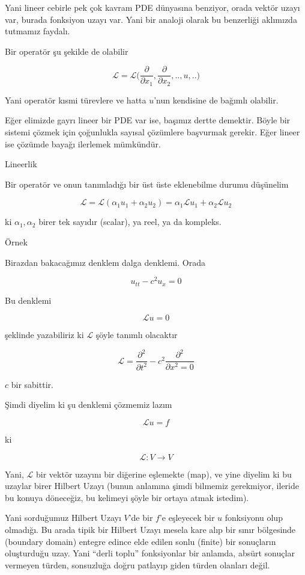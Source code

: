 \documentclass[12pt,fleqn]{article}\usepackage{../../common}
\begin{document}
Yani lineer cebirle pek çok kavram PDE dünyasına benziyor, orada vektör
uzayı var, burada fonksiyon uzayı var. Yani bir analoji olarak bu
benzerliği aklımızda tutmamız faydalı. 

Bir operatör şu şekilde de olabilir

$$ \mathcal{L} = \mathcal{L} \bigg(
\frac{\partial }{\partial x_1}, \frac{\partial }{\partial x_2},..,
u,..
\bigg)
 $$

Yani operatör kısmi türevlere ve hatta $u$'nun kendisine de bağımlı
olabilir. 

Eğer elimizde gayrı lineer bir PDE var ise, başımız dertte demektir. Böyle
bir sistemi çözmek için çoğunlukla sayısal çözümlere başvurmak
gerekir. Eğer lineer ise çözümde bayağı ilerlemek mümkündür. 

Lineerlik

Bir operatör ve onun tanımladığı bir üst üste eklenebilme durumu düşünelim

$$ \mathcal{L} = \mathcal{L}(\alpha_1 u_1 + \alpha_2 u_2) = 
\alpha_1 \mathcal{L}u_1 + \alpha_2 \mathcal{L}u_2 $$

ki $\alpha_1,\alpha_2$ birer tek sayıdır (scalar), ya reel, ya da kompleks. 

Örnek

Birazdan bakacağımız denklem dalga denklemi. Orada

$$ u_{tt} - c^2u_x = 0 $$

Bu denklemi

$$ \mathcal{L}u = 0 $$

şeklinde yazabiliriz ki $\mathcal{L}$ şöyle tanımlı olacaktır

$$ \mathcal{L} = \frac{\partial^2}{\partial t^2} - 
c^2 \frac{\partial ^2}{\partial x^2 = 0}$$

$c$ bir sabittir. 

Şimdi diyelim ki şu denklemi çözmemiz lazım

$$\mathcal{L} u = f $$

ki

$$ \mathcal{L}: V \to V $$

Yani, $\mathcal{L}$ bir vektör uzayını bir diğerine eşlemekte (map), ve yine diyelim
ki bu uzaylar birer Hilbert Uzayı (bunun anlamına şimdi bilmemiz
gerekmiyor, ileride bu konuya döneceğiz, bu kelimeyi şöyle bir ortaya atmak
istedim). 

Yani sorduğumuz Hilbert Uzayı $V$'de bir $f$'e eşleyecek bir $u$ fonksiyonu
olup olmadığı. Bu arada tipik bir Hilbert Uzayı mesela kare alıp bir sınır
bölgesinde (boundary domain) entegre edince elde edilen sonlu (finite) bir
sonuçların oluşturduğu uzay. Yani ``derli toplu'' fonksiyonlar bir anlamda,
absürt sonuçlar vermeyen türden, sonsuzluğa doğru patlayıp giden türden
olanları değil. 
\end{document}
